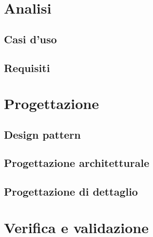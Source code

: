 \documentclass[12pt,a4paper,twoside,openright,english]{book}
\begin{document}
\chapter{Analisi}\label{analisi}

\section{Casi d'uso}\label{usecase}

\begin{small}

\end{small}





\section{Requisiti}\label{requisiti}


\chapter{Progettazione}\label{progettazione}

\section{Design pattern}\label{design_pattern}
\section{Progettazione architetturale}\label{progettazione_architetturale}
\section{Progettazione di dettaglio}\label{progettazione_dettaglio}

\chapter{Verifica e validazione}\label{verifica_validazione}
\end{document}
